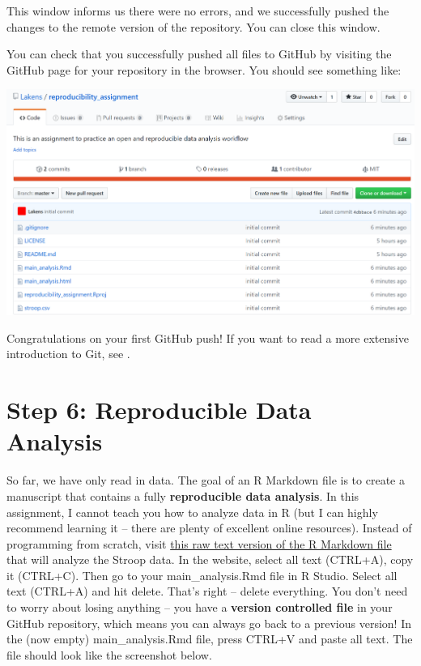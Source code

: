 \documentclass[
  oneside]{book}
\begin{document}
This window informs us there were no errors, and we successfully pushed the
changes to the remote version of the repository. You can close this window.

You can check that you successfully pushed all files to GitHub by visiting the
GitHub page for your repository in the browser. You should see something like:

\begin{center}\includegraphics[width=1\linewidth]{images/9eb79724ec82b5a99d62938388c43d3a} \end{center}

Congratulations on your first GitHub push! If you want to read a more extensive introduction to Git, see \citet{vuorre_curating_2018}.

\hypertarget{step-6-reproducible-data-analysis}{%
\section{Step 6: Reproducible Data Analysis}\label{step-6-reproducible-data-analysis}}

So far, we have only read in data. The goal of an R Markdown file is to create a manuscript that contains a fully \textbf{reproducible data analysis}. In this assignment, I cannot teach you how to analyze data in R (but I can highly recommend learning it -- there are plenty of excellent online resources). Instead of programming from scratch, visit \href{https://raw.githubusercontent.com/Lakens/reproducibility_assignment/master/main_analysis.Rmd}{this raw text version of the R Markdown file} that will analyze the Stroop data. In the website, select all text (CTRL+A), copy it (CTRL+C). Then go to your main\_analysis.Rmd file in R Studio. Select all text (CTRL+A) and hit delete. That's right -- delete everything. You don't need to worry about losing anything -- you have a \textbf{version controlled file} in your GitHub repository, which means you can always go back to a previous version! In the (now empty) main\_analysis.Rmd file, press CTRL+V and paste all text. The file should look like the screenshot below.
\end{document}
